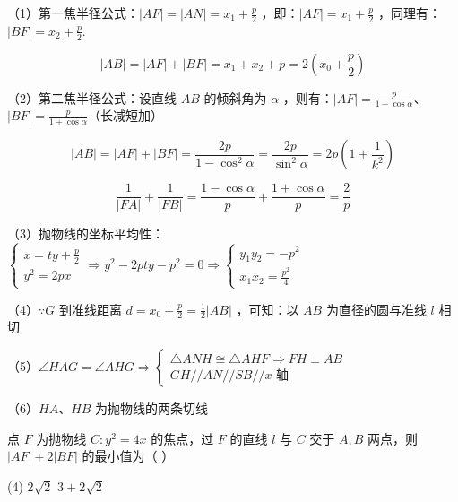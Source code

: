\begin{theorem}

    （1）第一焦半径公式：$|A F|=|A N|=x_1+\frac{p}{2}$ ，即：$|A F|=x_1+\frac{p}{2}$ ，同理有：$|B F|=x_2+\frac{p}{2}$.

    $$|A B|=|A F|+|B F|=x_1+x_2+p=2\left(x_0+\frac{p}{2}\right)$$

    （2）第二焦半径公式：设直线 $A B$ 的倾斜角为 $\alpha$ ，则有：$|A F|=\frac{p}{1-\cos \alpha}$、$|B F|=\frac{p}{1+\cos \alpha}$（长减短加）

    $$|A B|=|A F|+|B F|=\frac{2 p}{1-\cos ^2 \alpha}=\frac{2 p}{\sin ^2 \alpha}=2 p\left(1+\frac{1}{k^2}\right)$$

    $$\frac{1}{|F A|}+\frac{1}{|F B|}=\frac{1-\cos \alpha}{p}+\frac{1+\cos \alpha}{p}=\frac{2}{p}$$

    （3）抛物线的坐标平均性：$\left\{\begin{array}{l}x=t y+\frac{p}{2} \\ y^2=2 p x\end{array} \Longrightarrow y^2-2 p t y-p^2=0 \Longrightarrow\left\{\begin{array}{l}y_1 y_2=-p^2 \\ x_1 x_2=\frac{p^2}{4}\end{array}\right.\right.$

    （4）$\because G$ 到准线距离 $d=x_0+\frac{p}{2}=\frac{1}{2}|A B|$ ，可知：以 $A B$ 为直径的圆与准线 $l$ 相切

    （5）$\angle H A G=\angle A H G \Longrightarrow\left\{\begin{array}{l}\triangle A N H \cong \triangle A H F \Longrightarrow F H \perp A B \\ G H / / A N / / S B / / x \text { 轴 }\end{array}\right.$

    （6）$H A$、$H B$ 为抛物线的两条切线
\end{theorem}

\begin{example}
    点 $F$ 为抛物线 $C: y^2=4 x$ 的焦点，过 $F$ 的直线 $l$ 与 $C$ 交于 $A, B$ 两点，则 $|A F|+2|B F|$ 的最小值为（ \hspace{2em}）
    \begin{tasks}(4)
        \task $2 \sqrt{2}$
        \task $3+2 \sqrt{2}$
    \end{tasks}
\end{example}


